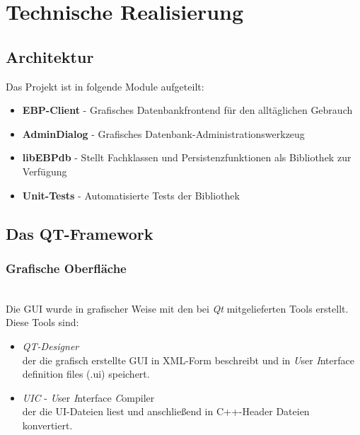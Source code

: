 \section{Technische Realisierung}

\subsection{Architektur}
Das Projekt ist in folgende Module aufgeteilt:
\begin{itemize}
	\item \textbf{EBP-Client} - Grafisches Datenbankfrontend für den alltäglichen Gebrauch
	\item \textbf{AdminDialog} - Grafisches Datenbank-Administrationswerkzeug
	\item \textbf{libEBPdb} - Stellt Fachklassen und Persistenzfunktionen als Bibliothek zur Verfügung
	\item \textbf{Unit-Tests} - Automatisierte Tests der Bibliothek
\end{itemize}

\subsection{Das QT-Framework}
\subsubsection{Grafische Oberfläche}\mbox{}\\
Die GUI wurde in grafischer Weise mit den bei \textit{Qt} mitgelieferten Tools erstellt.\\Diese Tools sind:
\begin{itemize}
	\item \textit{QT-Designer}\\[\baselineskip]der die grafisch erstellte GUI in XML-Form beschreibt und in \textit{U}ser \textit{I}nterface definition files (.ui) speichert.
	\item \textit{UIC} - \textit{U}ser \textit{I}nterface \textit{C}ompiler\\[\baselineskip]der die UI-Dateien liest und anschließend in C++-Header Dateien konvertiert.
\end{itemize}
